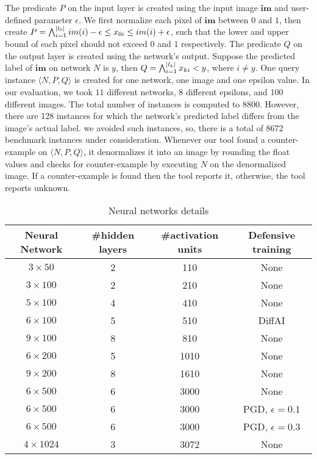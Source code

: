 The predicate $P$ on the input layer is created using the input image $\boldsymbol{im}$ and user-defined parameter $\epsilon$.  We first normalize each pixel of $\boldsymbol{im}$ between $0$ and $1$, then create  $P = \bigwedge_{i=1}^{|l_0|} im(i)-\epsilon \leq x_{0i}\leq im(i)+\epsilon$, such that the lower and upper bound of each pixel should not exceed $0$ and $1$ respectively. The predicate $Q$ on the output layer is created using the network's output.     Suppose the predicted label of $\boldsymbol{im}$ on network $N$ is $y$, then $Q = \bigwedge_{i=1}^{|l_k|} x_{ki} < y$, where $i \neq y$.  One query instance $\langle N,P,Q \rangle$ is created for one network, one image and one epsilon value.  In our evaluation, we took $11$ different networks, 8 different epsilons, and 100 different images. The 
total number of instances is computed to $8800$. However, there are 128 instances for which the network's predicted label differs from the image's actual label. we avoided such instances, so, there is a total of $8672$ benchmark instances
under consideration.    Whenever our tool found a counter-example on $\langle N,P,Q \rangle$, it denormalizes it into an image by rounding the float values 
and checks for counter-example by executing $N$ on the denormalized image.
If a counter-example is found then the tool reports it, otherwise, the tool reports unknown.



\begin{table}[t]
    \centering
    \begin{tabular}{c|c|c|c}
        \hline
        \textbf{Neural Network} & \textbf{\#hidden layers} & \textbf{\#activation units} & \textbf{Defensive training} \\
        \hline
        $3\times 50$ & 2 & 110 & None \\
        $3\times 100$ & 2 & 210 & None  \\
        $5\times 100$ & 4 & 410 & None  \\
        $6\times 100$ & 5 & 510 & DiffAI \\
        $9\times 100$ & 8 & 810 & None  \\
        $6\times 200$ & 5 & 1010 & None  \\
        $9\times 200$ & 8 & 1610 & None  \\
        $6\times 500$ & 6 & 3000 & None  \\
        $6\times 500$ & 6 & 3000 & PGD, $\epsilon = 0.1$ \\
        $6\times 500$ & 6 & 3000 & PGD, $\epsilon = 0.3$ \\
        $4\times 1024$ & 3 & 3072 & None  \\
        \hline
    \end{tabular}
    \caption{Neural networks details}
    \label{tb:nndetail}
\end{table}

